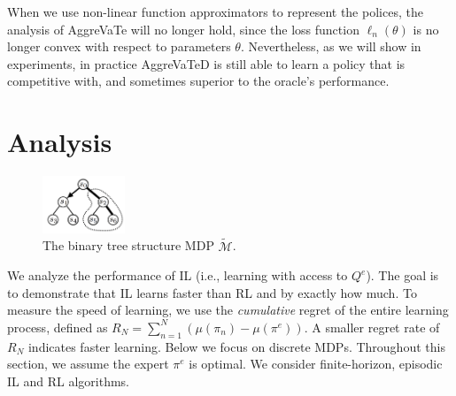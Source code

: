 \documentclass{article}
\begin{document}
When we use non-linear function approximators to represent the polices, the analysis of AggreVaTe  will no longer hold, since the loss function $\ell_n(\theta)$ is no longer convex with respect to parameters $\theta$. Nevertheless, as we will show in experiments, in practice AggreVaTeD is still able to learn a policy that is competitive with, and sometimes superior to the oracle's performance.  




\section{Analysis}
\begin{figure}
  \centering
      \includegraphics[trim={1cm 0.5cm 0 1cm},clip, width=0.22\textwidth]{./figure/binary_tree_MDP}
  \caption{The binary tree structure MDP $\tilde{\mathcal{M}}$. %
  }
  \label{fig:binary_MDP}
  \vspace{-5pt}
\end{figure}
We analyze the performance of IL (i.e., learning with access to $Q^e$). The goal is to demonstrate that IL learns faster than RL and  by exactly how much. To measure the speed of learning, we use the \emph{cumulative} regret of the entire learning process, defined as $R_N = \sum_{n=1}^N (\mu(\pi_n) - \mu(\pi^e))$. A smaller regret rate of $R_N$ indicates faster learning. Below we focus on discrete MDPs. Throughout this section, we assume the expert $\pi^e$ is optimal. We consider finite-horizon, episodic IL and RL algorithms. 
\end{document}
